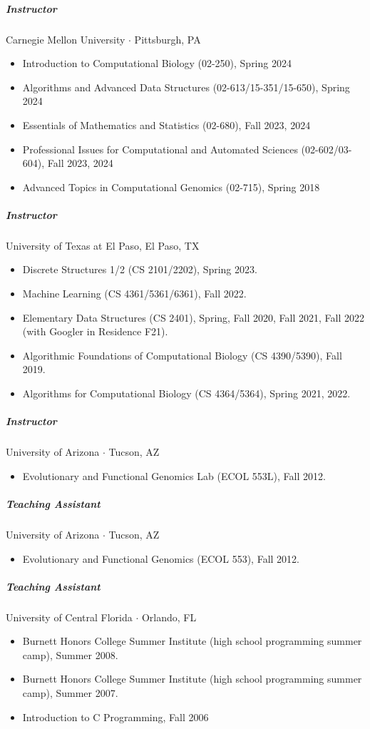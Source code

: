 \documentclass[10pt,letterpaper]{article}
\newcommand{\bigdot}{$\cdot$\xspace}
\begin{document}
\subparagraph{Instructor}  Carnegie Mellon University \bigdot Pittsburgh, PA
\begin{itemize}
    \item Introduction to Computational Biology (02-250), Spring 2024
    \item Algorithms and Advanced Data Structures (02-613/15-351/15-650), Spring 2024\footnotemark[1]
    \item Essentials of Mathematics and Statistics (02-680), Fall 2023\footnotemark[1], 2024
    \item Professional Issues for Computational and Automated Sciences (02-602/03-604), Fall 2023\footnotemark[1], 2024\footnotemark[1]
    \item Advanced Topics in Computational Genomics (02-715), Spring 2018\footnotemark[1]
 \end{itemize}

\subparagraph{Instructor}  University of Texas at El Paso, El Paso, TX
\begin{itemize}
	\item Discrete Structures 1/2 (CS 2101/2202), Spring 2023.
	\item Machine Learning (CS 4361/5361/6361), Fall 2022.
	\item Elementary Data Structures (CS 2401), Spring, Fall 2020, Fall 2021, Fall 2022 (with Googler in Residence F21).
	\item Algorithmic Foundations of Computational Biology (CS 4390/5390), Fall 2019.
	\item Algorithms for Computational Biology (CS 4364/5364), Spring 2021, 2022.
\end{itemize}


\subparagraph{Instructor} University of Arizona \bigdot Tucson, AZ
\begin{itemize}
    \item Evolutionary and Functional Genomics Lab (ECOL 553L), Fall 2012.
\end{itemize}

\subparagraph{Teaching Assistant}
University of Arizona \bigdot Tucson, AZ
\begin{itemize}
    \item Evolutionary and Functional Genomics (ECOL 553), Fall 2012.
\end{itemize}

\subparagraph{Teaching Assistant}
University of Central Florida \bigdot Orlando, FL
\begin{itemize}
    \item Burnett Honors College Summer Institute (high school programming summer camp), Summer 2008.
    \item Burnett Honors College Summer Institute (high school programming summer camp), Summer 2007.
    \item Introduction to C Programming, Fall 2006
\end{itemize}
\end{document}
